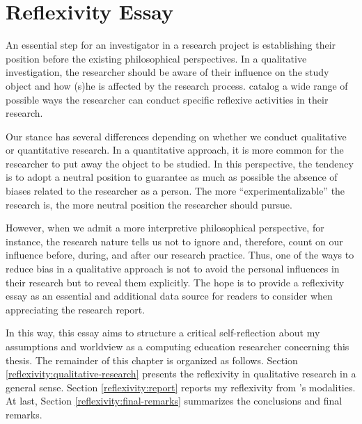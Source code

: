 \chapter{Reflexivity Essay}
\label{chap:reflex-essay}

An essential step for an investigator in a research project is establishing their position before the existing philosophical perspectives. In a qualitative investigation, the researcher should be aware of their influence on the study object and how (s)he is affected by the research process.  catalog a wide range of possible ways the researcher can conduct specific reflexive activities in their research.

Our stance has several differences depending on whether we conduct qualitative or quantitative research. In a quantitative approach, it is more common for the researcher to put away the object to be studied. In this perspective, the tendency is to adopt a neutral position to guarantee as much as possible the absence of biases related to the researcher as a person. The more “experimentalizable” the research is, the more neutral position the researcher should pursue. 

However, when we admit a more interpretive philosophical perspective, for instance, the research nature tells us not to ignore and, therefore, count on our influence before, during, and after our research practice. Thus, one of the ways to reduce bias in a qualitative approach is not to avoid the personal influences in their research but to reveal them explicitly. The hope is to provide a reflexivity essay as an essential and additional data source for readers to consider when appreciating the research report.

In this way, this essay aims to structure a critical self-reflection about my assumptions and worldview as a computing education researcher concerning this thesis. The remainder of this chapter is organized as follows. Section \ref{reflexivity:qualitative-research} presents the reflexivity in qualitative research in a general sense. Section \ref{reflexivity:report} reports my reflexivity from 's modalities. %
At last, Section \ref{reflexivity:final-remarks} summarizes the conclusions and final remarks.
